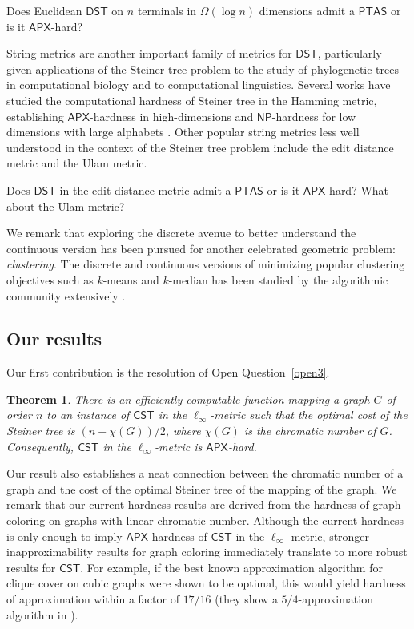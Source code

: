 \documentclass{article}\providecommand{\DeclareRedundantLanguages}[2]{}\usepackage[a4paper,margin=20mm]{geometry}
\newtheorem{theorem}{Theorem}\newtheorem{lemma}[theorem]{Lemma}\newtheorem{proposition}[theorem]{Proposition}\newtheorem{corollary}[theorem]{Corollary}\newtheorem{definition}[theorem]{Definition}\newtheorem{claim}[theorem]{Claim}\newtheorem{remark}[theorem]{Remark}\newtheorem{observation}[theorem]{Observation}\newtheorem{conjecture}[theorem]{Conjecture}\newtheorem{example}[theorem]{Example}
\newcommand{\1}{\textbf{1}}
\newcommand{\cst}{$\mathsf{CST}$\xspace}
\newcommand{\dst}{$\mathsf{DST}$\xspace}
\newcommand{\np}{$\mathsf{NP}$\xspace}
\newcommand{\apx}{$\mathsf{APX}$\xspace}
\newcommand{\ptas}{$\mathsf{PTAS}$\xspace}
\begin{document}
\begin{openq}\label{open4}
Does Euclidean \dst on $n$ terminals in $\Omega(\log n)$ dimensions admit a \ptas or is it \apx-hard?\end{openq}

String metrics are another important family of metrics for \dst, particularly given applications of the Steiner tree problem to the study of phylogenetic trees in computational biology and to computational linguistics. Several works have studied the computational hardness of Steiner tree in the Hamming metric, establishing \apx-hardness in high-dimensions and \np-hardness for low dimensions with large alphabets \cite{Wareham_1995, althaus2013low, sankoff1975minimal, foulds1982steiner, fernandez1998approximability}.  Other popular string metrics less well understood in the context of the Steiner tree problem include the edit distance metric \cite{lev1966binary} and the Ulam metric.
\begin{openq}\label{open5}
Does \dst in the edit distance metric admit a \ptas or is it \apx-hard? What about the Ulam metric?
\end{openq}

We remark that exploring the discrete avenue to better understand the continuous version has been pursued for another celebrated geometric problem: \emph{clustering}. The discrete and continuous versions of minimizing popular clustering objectives such as $k$-means and $k$-median has been studied by the algorithmic community extensively \cite{byrka2017improved,DBLP:journals/siamcomp/AhmadianNSW20,CNS22,CK19,CKL22}.




\subsection{Our results}\label{sec:results}

Our first contribution is the resolution of Open Question~\ref{open3}. 

\begin{theorem} \label{thm:introellinf}
There is an efficiently computable function mapping a graph $G$ of order $n$ to an instance of \cst in the $\ell_{\infty}$-metric such that the optimal cost of the Steiner tree is $(n + \chi(G))/2$, where $\chi(G)$ is the chromatic number of $G$. Consequently, \cst in the $\ell_{\infty}$-metric is \apx-hard.
\end{theorem}

Our result also establishes a neat connection between the chromatic number of a graph and the cost of the optimal Steiner tree of the mapping of the graph. We remark that our current hardness results are derived from the hardness of graph coloring on graphs with linear chromatic number. Although the current hardness is only enough to imply \apx-hardness of \cst in the $\ell_{\infty}$-metric, stronger inapproximability results for graph coloring immediately translate to more robust results for \cst. For example, if the best known approximation algorithm for clique cover on cubic graphs were shown to be optimal, this would yield hardness of approximation within a factor of $17/16$ (they show a $5/4$-approximation algorithm in \cite{Cerioli_Faria_Ferreira_Martinhon_Protti_Reed_2008}). 
\end{document}
